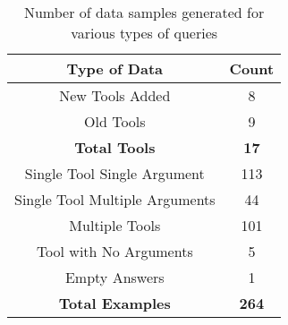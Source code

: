 \documentclass[10pt,twocolumn,letterpaper]{article}
\begin{document}
\begin{table}[htp]
\centering
\begin{tabular}{|c|c|}
\hline
\textbf{Type of Data}     & \textbf{Count} \\ \hline
New Tools Added           & 8                                         \\ \hline
Old Tools                 & 9                                         \\ \hline
\textbf{Total Tools}               & \textbf{17}                                        \\ \hline
Single Tool Single Argument         & 113                              \\ \hline
Single Tool Multiple Arguments & 44                               \\ \hline
Multiple Tools            & 101                              \\ \hline
Tool with No Arguments    & 5                                \\ \hline
Empty Answers             & 1                                \\ \hline
\textbf{Total Examples}   & \textbf{264}                              \\ \hline
\end{tabular}
\caption{Number of data samples generated for various types of queries}
\label{tab:dataset_stats_based_on_complexity}
\end{table}
\end{document}
